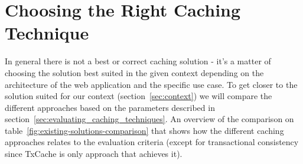 %
%


\section{Choosing the Right Caching Technique}
\label{sec:choosing_the_right_caching_technique}

In general there is not a best or correct caching solution - it's a matter of choosing the solution best suited in the given context depending on the architecture of the web application and the specific use case. To get closer to the solution suited for our context (section~\ref{sec:context}) we will compare the different approaches based on the parameters described in section~\ref{sec:evaluating_caching_techniques}. An overview of the comparison on table~\ref{fig:existing-solutions-comparison} that shows how the different caching approaches relates to the evaluation criteria (except for transactional consistency since TxCache is only approach that achieves it).

